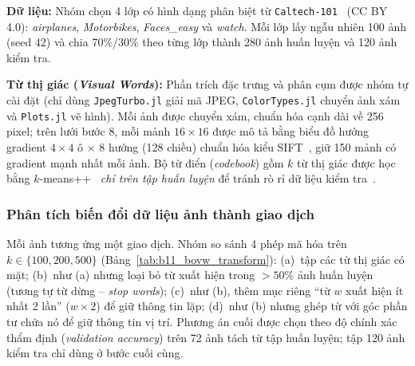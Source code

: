 \textbf{Dữ liệu:} Nhóm chọn 4 lớp có hình dạng phân biệt từ \texttt{Caltech-101}~\cite{feifei2004learning} (CC BY 4.0): \emph{airplanes}, \emph{Motorbikes}, \emph{Faces\_easy} và \emph{watch}. Mỗi lớp lấy ngẫu nhiên 100 ảnh (seed $42$) và chia 70\%/30\% theo từng lớp thành 280 ảnh huấn luyện và 120 ảnh kiểm tra.

\textbf{Từ thị giác (\emph{Visual Words}):} Phần trích đặc trưng và phân cụm được nhóm tự cài đặt (chỉ dùng \texttt{JpegTurbo.jl} giải mã JPEG, \texttt{ColorTypes.jl} chuyển ảnh xám và \texttt{Plots.jl} vẽ hình). Mỗi ảnh được chuyển xám, chuẩn hóa cạnh dài về 256 pixel; trên lưới bước 8, mỗi mảnh $16 \times 16$ được mô tả bằng biểu đồ hướng gradient $4 \times 4$ ô $\times$ 8 hướng (128 chiều) chuẩn hóa kiểu SIFT~\cite{lowe2004distinctive,dalal2005histograms}, giữ 150 mảnh có gradient mạnh nhất mỗi ảnh. Bộ từ điển (\emph{codebook}) gồm $k$ từ thị giác được học bằng $k$-means++~\cite{arthur2007kmeans} \emph{chỉ trên tập huấn luyện} để tránh rò rỉ dữ liệu kiểm tra~\cite{sivic2003video,csurka2004visual}.

\subsubsection{Phân tích biến đổi dữ liệu ảnh thành giao dịch}
Mỗi ảnh tương ứng một giao dịch. Nhóm so sánh 4 phép mã hóa trên $k \in \{100, 200, 500\}$ (Bảng~\ref{tab:b11_bovw_transform}): (a)~tập các từ thị giác có mặt; (b)~như (a) nhưng loại bỏ từ xuất hiện trong $>50\%$ ảnh huấn luyện (tương tự từ dừng -- \emph{stop words}); (c)~như (b), thêm mục riêng ``từ $w$ xuất hiện ít nhất 2 lần'' ($w{\times}2$) để giữ thông tin lặp; (d)~như (b) nhưng ghép từ với góc phần tư chứa nó để giữ thông tin vị trí. Phương án cuối được chọn theo độ chính xác thẩm định (\emph{validation accuracy}) trên 72 ảnh tách từ tập huấn luyện; tập 120 ảnh kiểm tra chỉ dùng ở bước cuối cùng.

